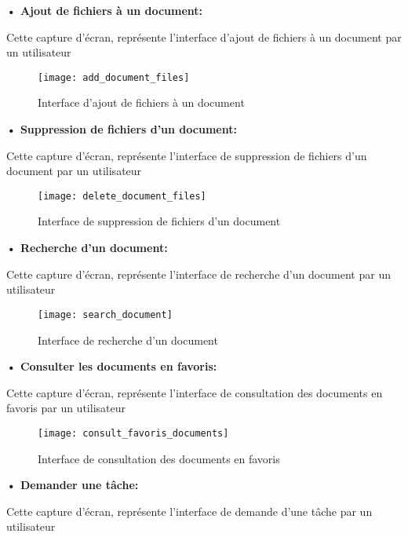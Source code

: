 \textbf{•	Ajout de fichiers à un document:}

Cette capture d'écran, représente l'interface d'ajout de fichiers à un document par un utilisateur

\begin{figure}[H]
  \centering
  \texttt{[image: add\_document\_files]}
  \caption{Interface d'ajout de fichiers à un document}
  \label{fig:add_document_files}
\end{figure}

\textbf{• Suppression de fichiers d'un document:}

Cette capture d'écran, représente l'interface de suppression de fichiers d'un document par un utilisateur

\begin{figure}[H]
  \centering
  \texttt{[image: delete\_document\_files]}
  \caption{Interface de suppression de fichiers d'un document}
  \label{fig:delete_document_files}
\end{figure}


\textbf{•	Recherche d'un document:}

Cette capture d'écran, représente l'interface de recherche d'un document par un utilisateur

\begin{figure}[H]
  \centering
  \texttt{[image: search\_document]}
  \caption{Interface de recherche d'un document}
  \label{fig:search_document}
\end{figure}

\textbf{•	Consulter les documents en favoris:}

Cette capture d'écran, représente l'interface de consultation des documents en favoris par un utilisateur

\begin{figure}[H]
  \centering
  \texttt{[image: consult\_favoris\_documents]}
  \caption{Interface de consultation des documents en favoris}
  \label{fig:consult_favoris_documents}
\end{figure}

\textbf{•	Demander une tâche:}

Cette capture d'écran, représente l'interface de demande d'une tâche par un utilisateur

